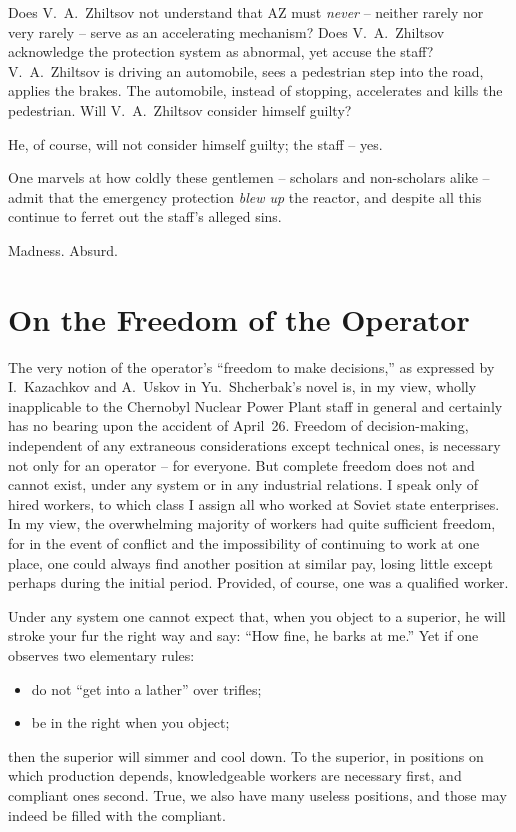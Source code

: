 \documentclass[openright]{bookest}
\begin{document}
Does V.~A.~Zhiltsov not understand that AZ must \textit{never} -- neither rarely nor very rarely -- serve as an accelerating mechanism? Does V.~A.~Zhiltsov acknowledge the protection system as abnormal, yet accuse the staff? V.~A.~Zhiltsov is driving an automobile, sees a pedestrian step into the road, applies the brakes. The automobile, instead of stopping, accelerates and kills the pedestrian. Will V.~A.~Zhiltsov consider himself guilty?

He, of course, will not consider himself guilty; the staff -- yes.

One marvels at how coldly these gentlemen -- scholars and non-scholars alike -- admit that the emergency protection \textit{blew up} the reactor, and despite all this continue to ferret out the staff's alleged sins.

Madness. Absurd.

\chapter{On the Freedom of the Operator}

The very notion of the operator's ``freedom to make decisions,'' as expressed by I.~Kazachkov and A.~Uskov in Yu.~Shcherbak's novel is, in my view, wholly inapplicable to the Chernobyl Nuclear Power Plant staff in general and certainly has no bearing upon the accident of April~26. Freedom of decision-making, independent of any extraneous considerations except technical ones, is necessary not only for an operator -- for everyone. But complete freedom does not and cannot exist, under any system or in any industrial relations. I speak only of hired workers, to which class I assign all who worked at Soviet state enterprises. In my view, the overwhelming majority of workers had quite sufficient freedom, for in the event of conflict and the impossibility of continuing to work at one place, one could always find another position at similar pay, losing little except perhaps during the initial period. Provided, of course, one was a qualified worker.

Under any system one cannot expect that, when you object to a superior, he will stroke your fur the right way and say: ``How fine, he barks at me.'' Yet if one observes two elementary rules:
\begin{itemize}
\item do not ``get into a lather'' over trifles;
\item be in the right when you object;
\end{itemize}
then the superior will simmer and cool down. To the superior, in positions on which production depends, knowledgeable workers are necessary first, and compliant ones second. True, we also have many useless positions, and those may indeed be filled with the compliant.
\end{document}

